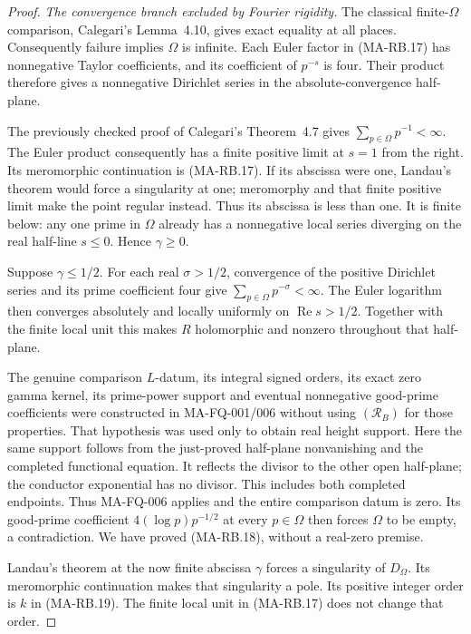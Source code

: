 \begin{proof}
\emph{The convergence branch excluded by Fourier rigidity.}
The classical finite-\(\Omega\) comparison, Calegari's
Lemma~4.10, gives exact equality at all places.
Consequently failure implies \(\Omega\) is infinite.
Each Euler factor in (MA-RB.17) has nonnegative Taylor
coefficients, and its coefficient of \(p^{-s}\) is four.
Their product therefore gives a nonnegative Dirichlet
series in the absolute-convergence half-plane.

The previously checked proof of Calegari's Theorem~4.7
gives \(\sum_{p\in\Omega}p^{-1}<\infty\).
The Euler product consequently has a finite positive
limit at \(s=1\) from the right.
Its meromorphic continuation is (MA-RB.17).
If its abscissa were one, Landau's theorem would force
a singularity at one; meromorphy and that finite positive
limit make the point regular instead.
Thus its abscissa is less than one.
It is finite below: any one prime in \(\Omega\) already
has a nonnegative local series diverging on the real
half-line \(s\le0\).
Hence \(\gamma\ge0\).

Suppose \(\gamma\le1/2\).
For each real \(\sigma>1/2\), convergence of the positive
Dirichlet series and its prime coefficient four give
\(\sum_{p\in\Omega}p^{-\sigma}<\infty\).
The Euler logarithm then converges absolutely and locally
uniformly on \(\operatorname{Re}s>1/2\).
Together with the finite local unit this makes \(R\)
holomorphic and nonzero throughout that half-plane.

The genuine comparison \(L\)-datum, its integral signed
orders, its exact zero gamma kernel, its prime-power
support and eventual nonnegative good-prime coefficients
were constructed in MA-FQ-001/006 without using
\((\mathcal R_B)\) for those properties.
That hypothesis was used only to obtain real height
support.  Here the same support follows from the just-proved
half-plane nonvanishing and the completed functional
equation.  It reflects the divisor to the other open
half-plane; the conductor exponential has no divisor.
This includes both completed endpoints.
Thus MA-FQ-006 applies and the entire comparison datum
is zero.  Its good-prime coefficient
\(4(\log p)p^{-1/2}\) at every \(p\in\Omega\) then forces
\(\Omega\) to be empty, a contradiction.
We have proved (MA-RB.18), without a real-zero premise.

Landau's theorem at the now finite abscissa \(\gamma\)
forces a singularity of \(D_\Omega\).
Its meromorphic continuation makes that singularity
a pole.  Its positive integer order is \(k\) in
(MA-RB.19).  The finite local unit in (MA-RB.17) does
not change that order.


\end{proof}
